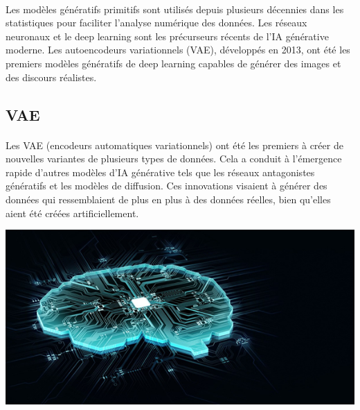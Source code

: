 \paragraph{}
Les modèles génératifs primitifs sont utilisés depuis plusieurs décennies dans
les statistiques pour faciliter l'analyse numérique des données. Les réseaux neuronaux
et le deep learning sont les précurseurs récents de l'IA générative moderne. Les
autoencodeurs variationnels (VAE), développés en 2013, ont été les premiers
modèles génératifs de deep learning capables de générer des images et des
discours réalistes.
\subsection{VAE}
\begin{center}
	\begin{minipage}{0.5\textwidth}
		\paragraph{}
		Les VAE (encodeurs automatiques variationnels) ont été les premiers à créer
		de nouvelles variantes de plusieurs types de données. Cela a conduit à l'émergence
		rapide d'autres modèles d'IA générative tels que les réseaux antagonistes génératifs
		et les modèles de diffusion. Ces innovations visaient à générer des données
		qui ressemblaient de plus en plus à des données réelles, bien qu’elles aient
		été créées artificiellement.
	\end{minipage}%
	\hfill
	\begin{minipage}{0.4\textwidth}
		\centering
		\includegraphics[width=\linewidth]{images/vae.png}
	\end{minipage}
\end{center}
